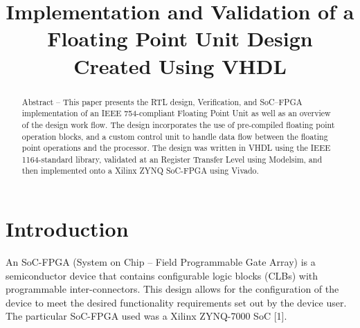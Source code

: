 \documentclass[conference]{IEEEtran}
\begin{document}
\title{Implementation and Validation of a Floating Point Unit Design Created Using VHDL}



\author{
}

\maketitle

\begin{abstract}
	
Abstract – This paper presents the RTL design, Verification, and SoC–FPGA implementation of an IEEE 754-compliant Floating Point Unit as well as an overview of the design work flow. The  design incorporates the use of pre-compiled floating point operation blocks, and a custom control unit to handle data flow between the floating point operations and the processor. The design was written in VHDL using the IEEE 1164-standard library, validated at an Register Transfer Level using Modelsim, and then implemented onto a Xilinx ZYNQ SoC-FPGA using Vivado.
\end{abstract}

\IEEEpeerreviewmaketitle

\section{Introduction}

An SoC-FPGA (System on Chip – Field Programmable Gate Array) is a semiconductor device that contains configurable logic blocks (CLBs) with programmable inter-connectors. This design allows for the configuration of the device to meet the desired functionality requirements set out by the device user. The particular SoC-FPGA used was a Xilinx ZYNQ-7000 SoC [1].
\newline
\end{document}
